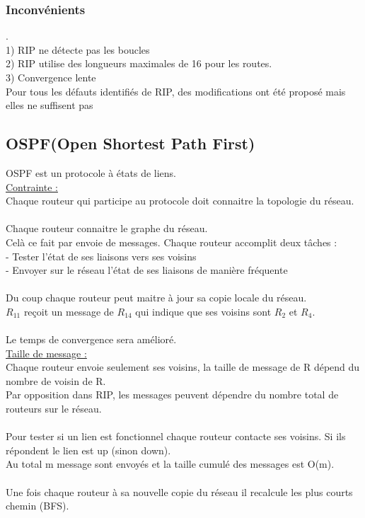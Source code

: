 \documentclass{article}
\begin{document}
\subsubsection*{Inconvénients}
. \\
1) RIP ne détecte pas les boucles \\
2) RIP utilise des longueurs maximales de 16 pour les routes. \\
3) Convergence lente \\
Pour tous les défauts identifiés de RIP, des modifications ont été proposé mais elles ne suffisent pas
\newpage
\subsection{OSPF(Open Shortest Path First)}
OSPF est un protocole à états de liens. \\
\underline{Contrainte : } \\
Chaque routeur qui participe au protocole doit connaitre la topologie du réseau. \\
\\
Chaque routeur connaitre le graphe du réseau. \\
Celà ce fait par envoie de messages. Chaque routeur accomplit deux tâches : \\
- Tester l'état de ses liaisons vers ses voisins \\
- Envoyer sur le réseau l'état de ses liaisons de manière fréquente \\
\\
Du coup chaque routeur peut maitre à jour sa copie locale du réseau. \\
$R_{11}$ reçoit un message de $R_{14}$ qui indique que ses voisins sont $R_2$ et $R_4$.\\
\\
Le temps de convergence sera amélioré. \\
\underline{Taille de message : } \\
Chaque routeur envoie seulement ses voisins, la taille de message de R dépend du nombre de voisin de R. \\
Par opposition dans RIP, les messages peuvent dépendre du nombre total de routeurs sur le réseau. \\
\\
Pour tester si un lien est fonctionnel chaque routeur contacte ses voisins. Si ils répondent le lien est up (sinon down). \\
Au total m message sont envoyés et la taille cumulé des messages est O(m). \\
\\
Une fois chaque routeur à sa nouvelle copie du réseau il recalcule les plus courts chemin (BFS). 
\end{document}

